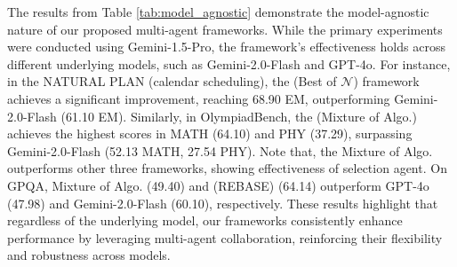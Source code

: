 
The results from Table \ref{tab:model_agnostic} demonstrate the model-agnostic nature of our proposed multi-agent frameworks. While the primary experiments were conducted using Gemini-1.5-Pro, the framework's effectiveness holds across different underlying models, such as Gemini-2.0-Flash and GPT-4o. For instance, in the NATURAL PLAN (calendar scheduling), the \plangen{} (Best of $\mathcal{N}$) framework achieves a significant improvement, reaching 68.90 EM, outperforming Gemini-2.0-Flash (61.10 EM). Similarly, in OlympiadBench, the \plangen{} (Mixture of Algo.) achieves the highest scores in MATH (64.10) and PHY (37.29), surpassing Gemini-2.0-Flash (52.13 MATH, 27.54 PHY). Note that, the Mixture of Algo. outperforms other three frameworks, showing effectiveness of selection agent. On GPQA, Mixture of Algo. (49.40) and \plangen{} (REBASE) (64.14) outperform GPT-4o (47.98) and Gemini-2.0-Flash (60.10), respectively. These results highlight that regardless of the underlying model, our frameworks consistently enhance performance by leveraging multi-agent collaboration, reinforcing their flexibility and robustness across models. 



